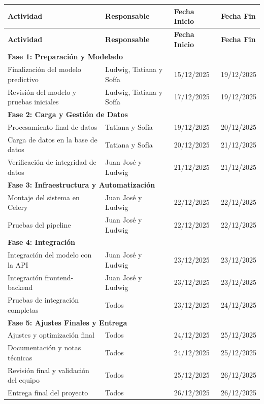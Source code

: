 \documentclass[12pt]{article}
\begin{document}
\begin{longtable}{p{4.5cm} p{3.5cm} p{3cm} p{3cm}}
\toprule
\textbf{Actividad} & \textbf{Responsable} & \textbf{Fecha Inicio} & \textbf{Fecha Fin} \\
\midrule
\endfirsthead

\toprule
\textbf{Actividad} & \textbf{Responsable} & \textbf{Fecha Inicio} & \textbf{Fecha Fin} \\
\midrule
\endhead

\multicolumn{4}{l}{\textbf{Fase 1: Preparación y Modelado}} \\
\midrule
Finalización del modelo predictivo & Ludwig, Tatiana y Sofía & 15/12/2025 & 19/12/2025 \\
Revisión del modelo y pruebas iniciales & Ludwig, Tatiana y Sofía & 17/12/2025 & 19/12/2025 \\
\midrule

\multicolumn{4}{l}{\textbf{Fase 2: Carga y Gestión de Datos}} \\
\midrule
Procesamiento final de datos & Tatiana y Sofía & 19/12/2025 & 20/12/2025 \\
Carga de datos en la base de datos & Tatiana y Sofía & 20/12/2025 & 21/12/2025 \\
Verificación de integridad de datos & Juan José y Ludwig & 21/12/2025 & 21/12/2025 \\
\midrule

\multicolumn{4}{l}{\textbf{Fase 3: Infraestructura y Automatización}} \\
\midrule
Montaje del sistema en Celery & Juan José y Ludwig & 22/12/2025 & 22/12/2025 \\
Pruebas del pipeline & Juan José y Ludwig & 22/12/2025 & 22/12/2025 \\
\midrule

\multicolumn{4}{l}{\textbf{Fase 4: Integración}} \\
\midrule
Integración del modelo con la API & Juan José y Ludwig & 23/12/2025 & 23/12/2025 \\
Integración frontend-backend & Juan José y Ludwig  & 23/12/2025 & 23/12/2025 \\
Pruebas de integración completas & Todos & 23/12/2025 & 24/12/2025 \\
\midrule

\multicolumn{4}{l}{\textbf{Fase 5: Ajustes Finales y Entrega}} \\
\midrule
Ajustes y optimización final & Todos & 24/12/2025 & 25/12/2025 \\
Documentación y notas técnicas & Todos & 24/12/2025 & 25/12/2025 \\
Revisión final y validación del equipo & Todos & 25/12/2025 & 26/12/2025 \\
Entrega final del proyecto & Todos & 26/12/2025 & 26/12/2025 \\
\bottomrule
\end{longtable}
\end{document}
